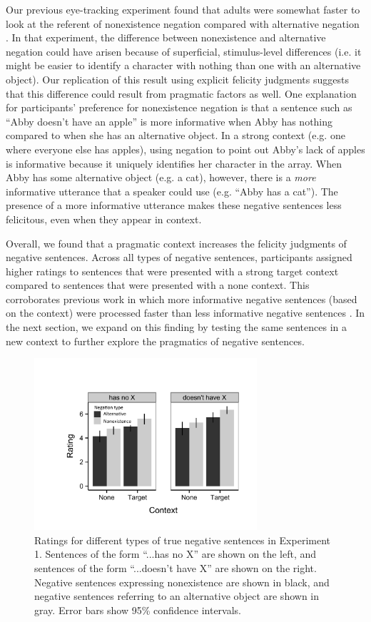 \documentclass[10pt,letterpaper]{article}
\begin{document}
Our previous eye-tracking experiment found that adults were somewhat faster to look at the referent of nonexistence negation compared with alternative negation \cite{nordmeyer2014b}. In that experiment, the difference between nonexistence and alternative negation could have arisen because of superficial, stimulus-level differences (i.e. it might be easier to identify a character with nothing than one with an alternative object). Our replication of this result using explicit felicity judgments suggests that this difference could result from pragmatic factors as well. One explanation for participants' preference for nonexistence negation is that a sentence such as ``Abby doesn't have an apple'' is more informative when Abby has nothing compared to when she has an alternative object.  In a strong context (e.g. one where everyone else has apples), using negation to point out Abby's lack of apples is informative because it uniquely identifies her character in the array.  When Abby has some alternative object (e.g. a cat), however, there is a \emph{more} informative utterance that a speaker could use (e.g. ``Abby has a cat'').  The presence of a more informative utterance makes these negative sentences less felicitous, even when they appear in context.

Overall, we found that a pragmatic context increases the felicity judgments of negative sentences.  Across all types of negative sentences, participants assigned higher ratings to sentences that were presented with a strong target context compared to sentences that were presented with a none context.  This corroborates previous work in which more informative negative sentences (based on the context) were processed faster than less informative negative sentences \cite{nordmeyer2014}.  In the next section, we expand on this finding by testing the same sentences in a new context to further explore the pragmatics of negative sentences.


\begin{figure}
\begin{center} 
\includegraphics[width=3.25in]{figures/study1.pdf}
\caption{\label{fig:s1} Ratings for different types of true negative sentences in Experiment 1.  Sentences of the form ``...has no X'' are shown on the left, and sentences of the form ``...doesn't have X'' are shown on the right.  Negative sentences expressing nonexistence are shown in black, and negative sentences referring to an alternative object are shown in gray.  Error bars show 95\% confidence intervals.}
\end{center} 
\end{figure}
\end{document}

